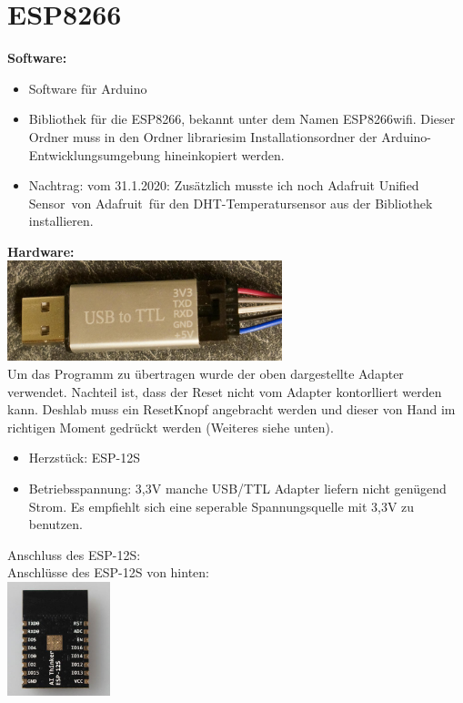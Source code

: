 \documentclass[11pt,fleqn]{book} %
\numberwithin{equation}{section} %
\numberwithin{figure}{section} %
\numberwithin{table}{section} %
\begin{document}
\chapter{ESP8266}
\textbf{Software:}\\
\begin{itemize}
 \item Software für Arduino
 \item Bibliothek für die ESP8266, bekannt unter dem Namen \glqq ESP8266wifi\grqq. Dieser Ordner muss in den Ordner \glqq libraries\grqq im Installationsordner der Arduino-Entwicklungsumgebung hineinkopiert werden.
 \item Nachtrag: vom 31.1.2020: Zusätzlich musste ich noch \glqq Adafruit Unified Sensor\grqq \ von \glqq Adafruit\grqq \ für den DHT-Temperatursensor aus der Bibliothek installieren.
\end{itemize}
\textbf{Hardware:\\}
\includegraphics[width=8cm]{Pictures/DSC01317.jpg}\\
Um das Programm zu übertragen wurde der oben dargestellte Adapter verwendet. Nachteil ist, dass der Reset nicht vom Adapter kontorlliert werden kann. Deshlab muss ein ResetKnopf angebracht werden und dieser von Hand im richtigen Moment gedrückt werden (Weiteres siehe unten).
\begin{itemize}
 \item Herzstück: ESP-12S
 \item Betriebsspannung: 3,3V manche USB/TTL Adapter liefern nicht genügend Strom. Es empfiehlt sich eine seperable Spannungsquelle mit 3,3V zu benutzen.
\end{itemize}
Anschluss des ESP-12S:\\
\newpage
Anschlüsse des ESP-12S von hinten:\\
\includegraphics[width=3cm]{Pictures/esp-12s.jpg}\\
\end{document}
